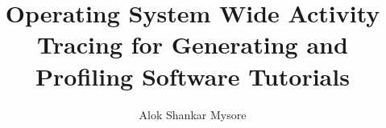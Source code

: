 \title{Operating System Wide Activity Tracing for Generating and Profiling Software Tutorials}
\author{Alok Shankar Mysore}

\begin{frontmatter}
\makefrontmatter


\tableofcontents
\listoffigures
\listoftables



\end{frontmatter}







